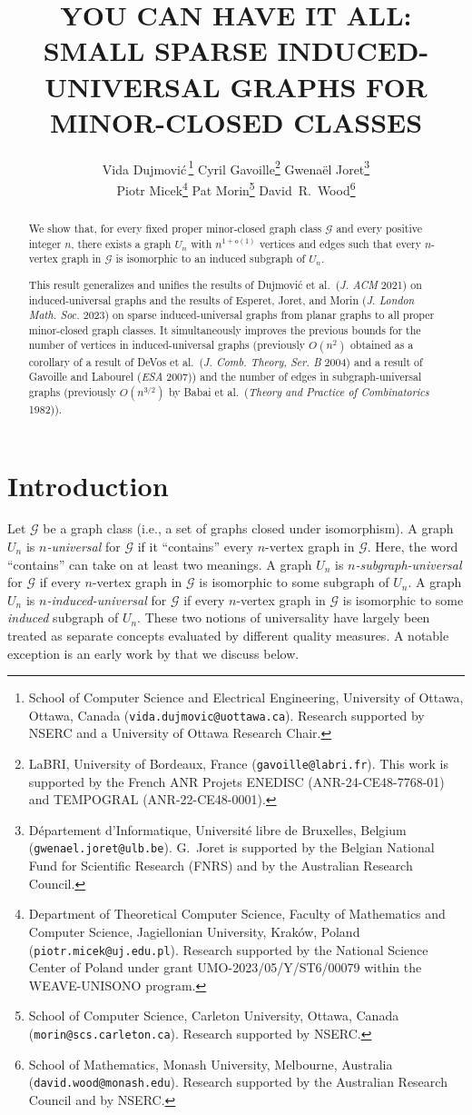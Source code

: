 \documentclass{patmorin}
\title{\MakeUppercase{\boldmath  You Can Have It All:  Small sparse induced-universal graphs for minor-closed classes}}
\author{
 Vida Dujmovi{\'c}\,\footnote{School of Computer Science and Electrical Engineering, University of Ottawa, Ottawa, Canada (\texttt{vida.dujmovic@uottawa.ca}). Research supported by NSERC and a University of Ottawa Research Chair.}
 \qquad
 Cyril Gavoille\footnote{LaBRI, University of Bordeaux, France (\texttt{gavoille@labri.fr}). This work is supported by the French ANR Projets ENEDISC (ANR-24-CE48-7768-01) and TEMPOGRAL (ANR-22-CE48-0001).}
 \qquad
  Gwena\"el Joret\footnote{D\'epartement d'Informatique, Universit\'e libre de Bruxelles, Belgium ({\tt gwenael.joret@ulb.be}). G.\ Joret is supported by the Belgian National Fund for Scientific Research (FNRS) and by the Australian Research Council.}\\[1ex]
Piotr Micek\footnote{Department of Theoretical Computer Science, Faculty of Mathematics and Computer Science, Jagiellonian University, Kraków, Poland (\texttt{piotr.micek@uj.edu.pl}). Research supported by the National Science Center of Poland under grant UMO-2023/05/Y/ST6/00079 within the WEAVE-UNISONO program.}
 \qquad
 Pat Morin\footnote{School of Computer Science, Carleton University, Ottawa, Canada (\texttt{morin@scs.carleton.ca}). Research supported by NSERC.}
 \qquad
 David~R.~Wood\footnote{School of Mathematics, Monash University, Melbourne, Australia (\texttt{david.wood@monash.edu}). Research supported by the Australian Research Council and by NSERC.}
 }
\date{}
\newcommand{\defin}[1]{\emph{\textcolor{brightmaroon}{#1}}}
\newcommand{\calG}{\mathcal{G}}
\begin{document}
\hypersetup{pageanchor=false}
\begin{titlepage}
\maketitle

\begin{abstract}
  We show that, for every fixed proper minor-closed graph class $\calG$ and every positive integer $n$, there exists a graph $U_n$ with $n^{1+o(1)}$ vertices and edges such that every $n$-vertex graph in $\calG$ is isomorphic to an induced subgraph of $U_n$.  

  This result generalizes and unifies the results of Dujmovi\'c et al.\ (\textit{J. ACM} 2021) on induced-universal graphs and the results of Esperet, Joret, and Morin (\textit{J. London Math. Soc.} 2023) on sparse induced-universal graphs from planar graphs to all proper minor-closed graph classes.
  It simultaneously improves the previous bounds for the number of vertices in induced-universal graphs (previously  $O(n^2)$ obtained as a corollary of a result of DeVos et al.\ (\textit{J. Comb. Theory, Ser. {B}} 2004) and a result of Gavoille and Labourel (\textit{ESA} 2007)) and  the number of edges in subgraph-universal graphs (previously  $O(n^{3/2})$ by Babai et al.\ (\emph{Theory and Practice of Combinatorics} 1982)). 
\end{abstract}
\end{titlepage}

\newpage
\tableofcontents
\thispagestyle{empty}
\newpage
\hypersetup{pageanchor=true}
\setcounter{page}{1}

\bigskip
\section{Introduction}

Let $\calG$ be a graph class (i.e., a set of graphs closed under isomorphism). A graph $U_n$ is \defin{$n$-universal} for $\calG$ if it ``contains'' every $n$-vertex graph in $\calG$.  Here, the word ``contains'' can take on at least two meanings.  A graph $U_n$ is \defin{$n$-subgraph-universal} for $\calG$ if every $n$-vertex graph in $\calG$ is isomorphic to some subgraph of $U_n$.  A graph $U_n$ is \defin{$n$-induced-universal} for $\calG$ if every $n$-vertex graph in $\calG$ is isomorphic to some \emph{induced} subgraph of $U_n$.  These two notions of universality have largely been treated as separate concepts evaluated by different quality measures. A notable exception is an early work by \citet{chung:universal} that we discuss below.
\end{document}
